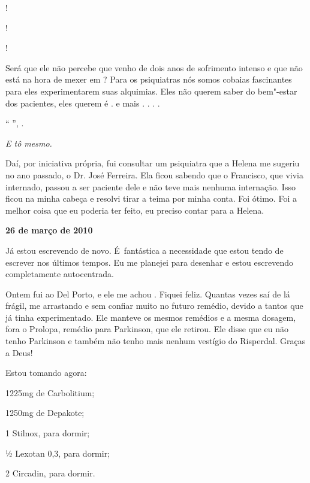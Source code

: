 !

!

!

Será que ele não percebe que venho de dois anos de sofrimento intenso e
que não está na hora de mexer em  ? Para os psiquiatras nós
somos cobaias fascinantes para eles experimentarem suas alquimias. Eles
não querem saber do bem"-estar dos pacientes, eles querem é 
.  e mais . . . .

`` '',  .

\emph{E tô mesmo.}

Daí, por iniciativa própria, fui consultar um psiquiatra que a Helena me
sugeriu no ano passado, o Dr. José Ferreira. Ela ficou sabendo que o
Francisco, que vivia internado, passou a ser paciente dele e não teve
mais nenhuma internação. Isso ficou na minha cabeça e resolvi tirar a
teima por minha conta. Foi ótimo. Foi a melhor coisa que eu poderia ter
feito, eu preciso contar para a Helena.

\begin{center}\textbf{\asterisc{}}\end{center}


\begin{flushright}\textbf{26 de março de 2010}\end{flushright}


Já estou escrevendo de novo. É~fantástica a necessidade que estou tendo
de escrever nos últimos tempos. Eu me planejei para desenhar e estou
escrevendo completamente autocentrada.

Ontem fui ao Del Porto, e ele me achou . Fiquei feliz. Quantas
vezes saí de lá frágil, me arrastando e sem confiar muito no futuro
remédio, devido a tantos que já tinha experimentado. Ele manteve os
mesmos remédios e a mesma dosagem, fora o Prolopa, remédio para
Parkinson, que ele retirou. Ele disse que eu não tenho Parkinson e
também não tenho mais nenhum vestígio do Risperdal. Graças a Deus!

Estou tomando agora:

1225mg de Carbolitium;

1250mg de Depakote;

1 Stilnox, para dormir;

½ Lexotan 0,3, para dormir;

2 Circadin, para dormir.

